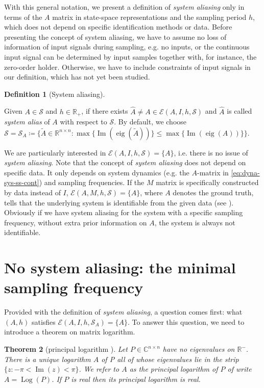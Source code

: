 \documentclass[letterpaper,10pt,journal,final]{IEEEtran}
\newtheorem{theorem}{Theorem}
\theoremstyle{definition}
\newtheorem{definition}[theorem]{Definition}
\theoremstyle{remark}
\newcommand{\im}{\operatorname{Im}}
\newcommand{\Log}{\operatorname{Log}}
\newcommand{\eig}{\operatorname{eig}}
\begin{document}
With this general notation, we present a definition of \emph{system aliasing}
only in terms of the $A$ matrix in state-space representations and the sampling
period $h$, which does not depend on specific identification methods or data.
Before presenting the concept of system aliasing, we have to assume no loss of
information of input signals during sampling, e.g. no inputs, or the continuous
input signal can be determined by input samples together with, for instance, the
zero-order holder. Otherwise, we have to include constraints of input signals in
our definition, which has not yet been studied.

\begin{definition}[System aliasing]
  \label{def:system-aliasing}

  Given $A \in \mathscr{S}$ and $h \in \mathbb{R}_+$, if there exists
  $\hat{A} \neq A \in \mathscr{E}(A, I, h, \mathscr{S})$ and $\hat{A}$ is called
  \emph{system alias} of $A$ with respect to $\mathscr{S}$.  By default, we
  choose
  $\mathscr{S} = \mathscr{S}_A \coloneqq \big\{ \tilde{A} \in \mathbb{R}^{n
    \times n}: \max\{\im(\eig(\tilde{A}))\} \leq \max\{\im(\eig({A}))\} \big\}$.
\end{definition}

We are particularly interested in $\mathscr{E}(A, I, h, \mathscr{S}) = \{A\}$,
i.e. there is no issue of \emph{system aliasing}.  Note that the concept of
\emph{system aliasing} does not depend on specific data. It only depends on
system dynamics (e.g. the $A$-matrix in \eqref{eq:dyna-sys-ss-cont}) and
sampling frequencies.  If the $M$ matrix is specifically constructed by data
instead of $I$, $\mathscr{E}(A, M, h, \mathscr{S}) = \{A\}$, where $A$ denotes
the ground truth, tells that the underlying system is identifiable from the
given data (see \cite[Sec.~III-B]{Yue2016b}).  Obviously if we have {system
  aliasing} for the system with a specific sampling frequency, without extra
prior information on $A$, the system is always not identifiable.





\section{No system aliasing: the minimal sampling frequency}
\label{sec:no-system-aliasing}



Provided with the definition of \emph{system aliasing}, a question comes first: what $(A, h)$ satisfies $\mathscr{E}(A, I, h, \mathscr{S}_A) = \{A\}$. To answer this question, we need to introduce a theorem on matrix logarithm.
\begin{theorem}[principal logarithm {\protect \cite[Thm.~1.31]{Higham2008}}]
  \label{thm:log-uniq-matrix}
  Let $P \in \mathbb{C}^{n \times n}$ have no eigenvalues on $\mathbb{R}^-$. There is a unique logarithm $A$ of P all of whose eigenvalues lie in the strip $\{ z: -\pi < \im(z) < \pi \}$. We refer to $A$ as the principal logarithm of $P$ of write $A = \Log(P)$. If $P$ is real then its principal logarithm is real.
\end{theorem}
\end{document}
